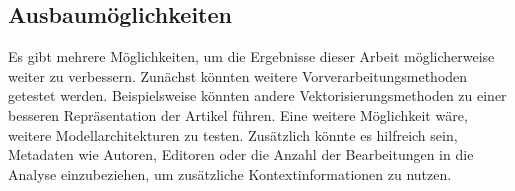 \subsection{Ausbaumöglichkeiten}
Es gibt mehrere Möglichkeiten, um die Ergebnisse dieser Arbeit möglicherweise weiter zu verbessern. Zunächst könnten weitere Vorverarbeitungsmethoden getestet werden. Beispielsweise könnten andere Vektorisierungsmethoden zu einer besseren Repräsentation der Artikel führen. Eine weitere Möglichkeit wäre, weitere Modellarchitekturen zu testen. Zusätzlich könnte es hilfreich sein, Metadaten wie Autoren, Editoren oder die Anzahl der Bearbeitungen in die Analyse einzubeziehen, um zusätzliche Kontextinformationen zu nutzen.
